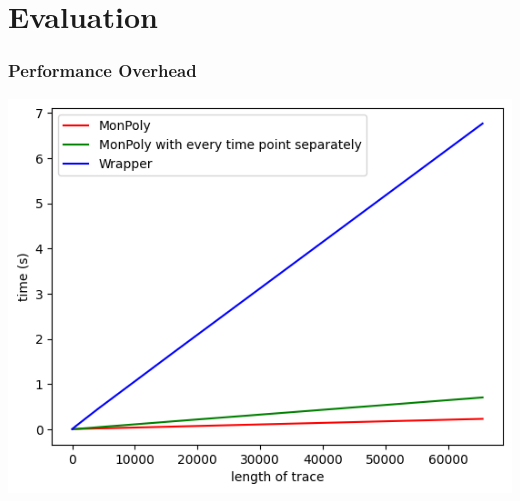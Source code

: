 \section{Evaluation}

\begin{frame}
    \frametitle{Performance Overhead}
    \centering
    \includegraphics[width=0.9\linewidth]{diagrams/wrapper-monpoly-total.png}
\end{frame}